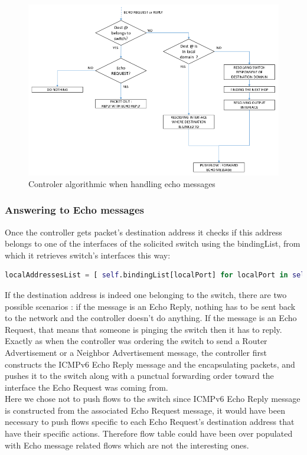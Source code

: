 \documentclass{article}
\begin{document}
\begin{figure}[h!]
  \centering
    \includegraphics[scale=0.3]{reportPictures/echo_message.png}
  \caption{Controler algorithmic when handling echo messages}
\end{figure}


\subsubsection{Answering to Echo messages}
Once the controller gets packet's destination address it checks if
this address belongs to one of the interfaces of the solicited switch
using the bindingList, from which it retrieves switch's interfaces
this way:

\begin{lstlisting}[frame=single,language=Python, breaklines=true] 
localAddressesList = [ self.bindingList[localPort] for localPort in self.bindingList.keys() if localPort[0]==dpid ]
\end{lstlisting}

If the destination address is indeed one belonging to the switch,
there are two possible scenarios : if the message is an Echo Reply,
nothing has to be sent back to the network and the controller
doesn't do anything. If the message is an Echo Request, that means
that someone is pinging the switch then it has to reply.\\
\newline
Exactly as when the controller was ordering the switch to send a
Router Advertisement or a Neighbor Advertisement message, the
controller first constructs the ICMPv6 Echo Reply message and the
encapsulating packets, and pushes it to the switch along with a
punctual forwarding order toward the interface the Echo Request was
coming from.\\
\newline
Here we chose not to push flows to the switch since ICMPv6 Echo Reply
message is constructed from the associated Echo Request message, it
would have been necessary to push flows specific to each Echo
Request's destination address that have their specific
actions. Therefore flow table could have been over populated with Echo
message related flows which are not the interesting ones.
\end{document}

